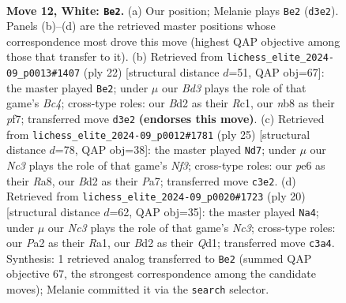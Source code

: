 \documentclass[11pt]{article}
\begin{document}
\clearpage

\begin{figure}[p]\centering
\begin{subfigure}{0.46\textwidth}\centering
\resizebox{\linewidth}{!}{%
\newchessgame
\chessboard[
  setfen={rnb2rk1/1p3ppp/p1q1pn2/8/1b6/2NBPN2/PP1B1PPP/R2Q1RK1 w - - 4 12},
  showmover=false,
  pgfstyle=straightmove, color=movearrow, markmove={d3-e2}
]}
\caption{}
\end{subfigure}\hfill
\begin{subfigure}{0.46\textwidth}\centering
\resizebox{\linewidth}{!}{%
\newchessgame
\chessboard[
  setfen={r1b2rk1/pp3pp1/4pq1p/2n5/1bB5/2N1PN2/PP3PPP/2RQ1RK1 w - - 0 12},
  showmover=false,
  pgfstyle=straightmove, color=movearrow, markmove={c4-e2}
]}
\caption{}
\end{subfigure}
\\[4pt]
\begin{subfigure}{0.46\textwidth}\centering
\resizebox{\linewidth}{!}{%
\newchessgame
\chessboard[
  setfen={r2q1rk1/pp2bppp/4nn2/3pB3/6b1/2N2NP1/PPQ1PPBP/R4RK1 b - - 5 13},
  showmover=false,
  pgfstyle=straightmove, color=movearrow, markmove={f6-d7}
]}
\caption{}
\end{subfigure}\hfill
\begin{subfigure}{0.46\textwidth}\centering
\resizebox{\linewidth}{!}{%
\newchessgame
\chessboard[
  setfen={r1bq1rk1/1p3ppp/p1n2n2/2b5/3p1B2/2NBPN2/PP3PPP/R2Q1RK1 w - - 0 11},
  showmover=false,
  pgfstyle=straightmove, color=movearrow, markmove={c3-a4}
]}
\caption{}
\end{subfigure}
\caption{\textbf{Move 12, White: \texttt{Be2}.} (a) Our position; Melanie plays \texttt{Be2} (\texttt{d3e2}). Panels (b)--(d) are the retrieved master positions whose correspondence most drove this move (highest QAP objective among those that transfer to it). (b) Retrieved from \texttt{lichess\_elite\_2024-09\_p0013\#1407} (ply 22) [structural distance $d$=51, QAP obj=67]: the master played \texttt{Be2}; under $\mu$ our \emph{Bd3} plays the role of that game's \emph{Bc4}; cross-type roles: our \emph{B}d2 as their \emph{R}c1, our \emph{n}b8 as their \emph{p}f7; transferred move \texttt{d3e2} \textbf{(endorses this move)}. (c) Retrieved from \texttt{lichess\_elite\_2024-09\_p0012\#1781} (ply 25) [structural distance $d$=78, QAP obj=38]: the master played \texttt{Nd7}; under $\mu$ our \emph{Nc3} plays the role of that game's \emph{Nf3}; cross-type roles: our \emph{p}e6 as their \emph{R}a8, our \emph{B}d2 as their \emph{P}a7; transferred move \texttt{c3e2}. (d) Retrieved from \texttt{lichess\_elite\_2024-09\_p0020\#1723} (ply 20) [structural distance $d$=62, QAP obj=35]: the master played \texttt{Na4}; under $\mu$ our \emph{Nc3} plays the role of that game's \emph{Nc3}; cross-type roles: our \emph{P}a2 as their \emph{R}a1, our \emph{B}d2 as their \emph{Q}d1; transferred move \texttt{c3a4}. Synthesis: 1 retrieved analog transferred to \texttt{Be2} (summed QAP objective 67, the strongest correspondence among the candidate moves); Melanie committed it via the \texttt{search} selector.}
\label{fig:thought-m22}
\end{figure}
\end{document}
